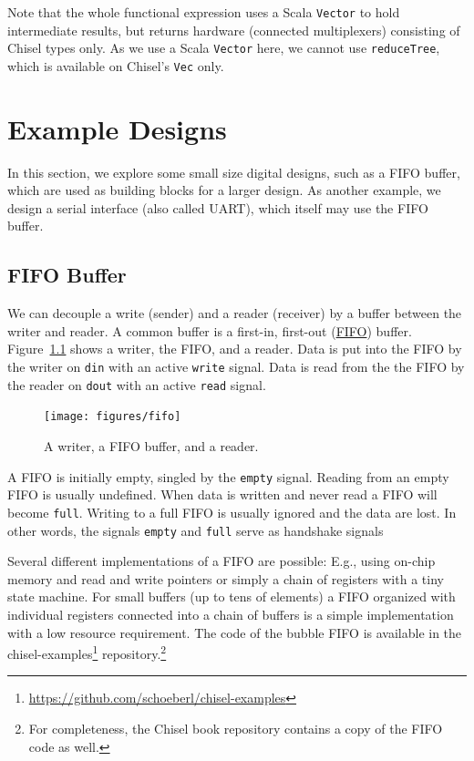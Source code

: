 \documentclass[%
    10pt,
    headinclude, footexclude,
    openright, %
    notitlepage,
    cleardoubleempty,
    headsepline,
    pointlessnumbers,
    bibtotoc, idxtotoc,
    ]{scrbook}
\newcommand{\code}[1]{{\small{\texttt{#1}}}}
\newcommand{\myref}[2]{\href{#1}{#2}}
\renewcommand{\myref}[2]{{#2}{\footnote{\url{#1}}}}
\begin{document}

Note that the whole functional expression uses a Scala \code{Vector} to hold intermediate results,
but returns hardware (connected multiplexers) consisting of Chisel types only.
As we use a Scala \code{Vector} here, we cannot use \code{reduceTree}, which is available on Chisel's
\code{Vec} only.
 



\chapter{Example Designs}

In this section, we explore some small size digital designs, such as
a FIFO buffer, which are used as building blocks for a larger design.
As another example, we design a serial interface (also called UART),
which itself may use the FIFO buffer.

\section{FIFO Buffer}
\label{sec:fifo}



We can decouple a write (sender) and a reader (receiver) by a buffer
between the writer and reader.
A common buffer is a first-in, first-out
(\href{https://en.wikipedia.org/wiki/FIFO_%28computing_and_electronics%29}{FIFO})
buffer. Figure~\ref{fig:fifo} shows a writer, the FIFO, and a reader.
Data is put into the FIFO by the writer on \code{din} with an active
\code{write} signal. Data is read from the the FIFO by the reader on
\code{dout} with an active \code{read} signal.

\begin{figure}
  \centering
  \texttt{[image: figures/fifo]}
  \caption{A writer, a FIFO buffer, and a reader.}
  \label{fig:fifo}
\end{figure}

A FIFO is initially empty, singled by the \code{empty} signal. Reading
from an empty FIFO is usually undefined. When data is written and never
read a FIFO will become \code{full}. Writing to a full FIFO is usually ignored
and the data are lost. In other words, the signals \code{empty} and \code{full}
serve as handshake signals 

Several different implementations of a FIFO are possible: E.g., using on-chip
memory and read and write pointers or simply a chain of registers with a
tiny state machine. For small buffers (up to tens of elements) a FIFO organized
with individual registers connected into a chain of buffers is a simple
implementation with a low resource requirement.
The code of the bubble FIFO is available in the
\myref{https://github.com/schoeberl/chisel-examples}{chisel-examples}
repository.\footnote{For completeness, the Chisel book repository contains
a copy of the FIFO code as well.}
\end{document}
